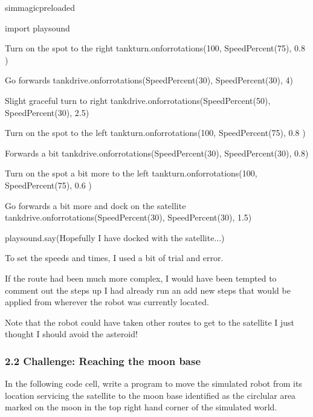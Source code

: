 \documentclass[letterpaper,10pt,english]{sphinxmanual}
\begin{document}
{
\begin{sphinxVerbatim}[commandchars=\\\{\}]
\llap{\color{nbsphinxin}[ ]:\,\hspace{\fboxrule}\hspace{\fboxsep}}\PYGZpc{}\PYGZpc{}sim\PYGZus{}magic\PYGZus{}preloaded

import playsound

\PYGZsh{} Turn on the spot to the right
tank\PYGZus{}turn.on\PYGZus{}for\PYGZus{}rotations(100, SpeedPercent(75), 0.8 )

\PYGZsh{} Go forwards
tank\PYGZus{}drive.on\PYGZus{}for\PYGZus{}rotations(SpeedPercent(30), SpeedPercent(30), 4)

\PYGZsh{} Slight graceful turn to right
tank\PYGZus{}drive.on\PYGZus{}for\PYGZus{}rotations(SpeedPercent(50), SpeedPercent(30), 2.5)

\PYGZsh{} Turn on the spot to the left
tank\PYGZus{}turn.on\PYGZus{}for\PYGZus{}rotations(\PYGZhy{}100, SpeedPercent(75), 0.8 )

\PYGZsh{} Forwards a bit
tank\PYGZus{}drive.on\PYGZus{}for\PYGZus{}rotations(SpeedPercent(30), SpeedPercent(30), 0.8)

\PYGZsh{}Turn on the spot a bit more to the left
tank\PYGZus{}turn.on\PYGZus{}for\PYGZus{}rotations(\PYGZhy{}100, SpeedPercent(75), 0.6 )

\PYGZsh{} Go forwards a bit more and dock on the satellite
tank\PYGZus{}drive.on\PYGZus{}for\PYGZus{}rotations(SpeedPercent(30), SpeedPercent(30), 1.5)

playsound.say(\PYGZdq{}Hopefully I have docked with the satellite...\PYGZdq{})
\end{sphinxVerbatim}
}

To set the speeds and times, I used a bit of trial and error.

If the route had been much more complex, I would have been tempted to comment out the steps up I had already run an add new steps that would be applied from wherever the robot was currently located.

Note that the robot could have taken other routes to get to the satellite \sphinxhyphen{} I just thought I should avoid the asteroid!


\subsubsection{2.2 Challenge: Reaching the moon base}
\label{\detokenize{content/03_Robot_Lab/Section_00_02:2.2-Challenge:-Reaching-the-moon-base}}
In the following code cell, write a program to move the simulated robot from its location servicing the satellite to the moon base identified as the circlular area marked on the moon in the top right hand corner of the simulated world.
\end{document}
